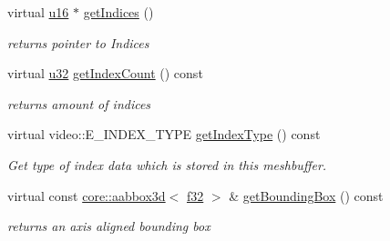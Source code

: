 \begin{DoxyCompactItemize}
\mbox{\label{structirr_1_1scene_1_1SSharedMeshBuffer_a16f7c525acba8d913b8de49dee869465}} 
virtual \hyperlink{namespaceirr_ae9f8ec82692ad3b83c21f555bfa70bcc}{u16} $\ast$ \hyperlink{structirr_1_1scene_1_1SSharedMeshBuffer_a16f7c525acba8d913b8de49dee869465}{get\+Indices} ()
\begin{DoxyCompactList}\small\item\em returns pointer to Indices \end{DoxyCompactList}\item 
\mbox{\label{structirr_1_1scene_1_1SSharedMeshBuffer_a97a95470c8956fc0120466e57698081a}} 
virtual \hyperlink{namespaceirr_a0416a53257075833e7002efd0a18e804}{u32} \hyperlink{structirr_1_1scene_1_1SSharedMeshBuffer_a97a95470c8956fc0120466e57698081a}{get\+Index\+Count} () const
\begin{DoxyCompactList}\small\item\em returns amount of indices \end{DoxyCompactList}\item 
\mbox{\label{structirr_1_1scene_1_1SSharedMeshBuffer_af9d02a1f61c5498cbe21be8185d1c803}} 
virtual video\+::\+E\+\_\+\+I\+N\+D\+E\+X\+\_\+\+T\+Y\+PE \hyperlink{structirr_1_1scene_1_1SSharedMeshBuffer_af9d02a1f61c5498cbe21be8185d1c803}{get\+Index\+Type} () const
\begin{DoxyCompactList}\small\item\em Get type of index data which is stored in this meshbuffer. \end{DoxyCompactList}\item 
\mbox{\label{structirr_1_1scene_1_1SSharedMeshBuffer_a5a736dee60a5f5ebc929dc03c0763082}} 
virtual const \hyperlink{classirr_1_1core_1_1aabbox3d}{core\+::aabbox3d}$<$ \hyperlink{namespaceirr_a0277be98d67dc26ff93b1a6a1d086b07}{f32} $>$ \& \hyperlink{structirr_1_1scene_1_1SSharedMeshBuffer_a5a736dee60a5f5ebc929dc03c0763082}{get\+Bounding\+Box} () const
\begin{DoxyCompactList}\small\item\em returns an axis aligned bounding box \end{DoxyCompactList}\item 
\mbox{\label{structirr_1_1scene_1_1SSharedMeshBuffer_a54e11fd284245c3f5e5e07145ad4a202}} 

\end{DoxyCompactItemize}
